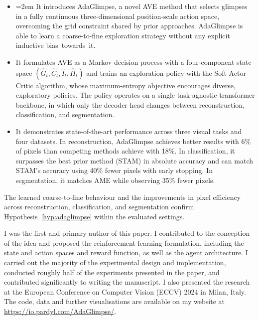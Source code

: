 \begin{itemize}
    \item {\emergencystretch=2em It introduces AdaGlimpse, a novel AVE method that selects glimpses in a fully continuous three-dimensional position-scale action space, overcoming the grid constraint shared by prior approaches. AdaGlimpse is able to learn a coarse-to-fine exploration strategy without any explicit inductive \mbox{bias towards it}.\par}
    \item It formulates AVE as a Markov decision process with a four-component state space $(\widehat{G}_t, \widehat{C}_t, \widehat{I}_t, \widehat{H}_t)$ and trains an exploration policy with the Soft Actor-Critic algorithm, whose maximum-entropy objective encourages diverse, exploratory policies. The policy operates on a single task-agnostic transformer backbone, in which only the decoder head changes between reconstruction, classification, and segmentation.
    \item It demonstrates state-of-the-art performance across three visual tasks and four datasets. In reconstruction, AdaGlimpse achieves better results with 6\% of pixels than competing methods achieve with 18\%. In classification, it surpasses the best prior method (STAM) in absolute accuracy and can match STAM's accuracy using 40\% fewer pixels with early stopping. In segmentation, it matches AME while observing 35\% fewer pixels.
\end{itemize}

The learned coarse-to-fine behaviour and the improvements in pixel efficiency across reconstruction, classification, and segmentation confirm Hypothesis~\ref{hyp:adaglimpse} within the evaluated settings.

I was the first and primary author of this paper. I contributed to the conception of the idea and proposed the reinforcement learning formulation, including the state and action spaces and reward function, as well as the agent architecture. I carried out the majority of the experimental design and implementation, conducted roughly half of the experiments presented in the paper, and contributed significantly to writing the manuscript. I also presented the research at the European Conference on Computer Vision (ECCV) 2024 in Milan, Italy. The code, data and further visualisations are available on my website at \url{https://io.pardyl.com/AdaGlimpse/}.
